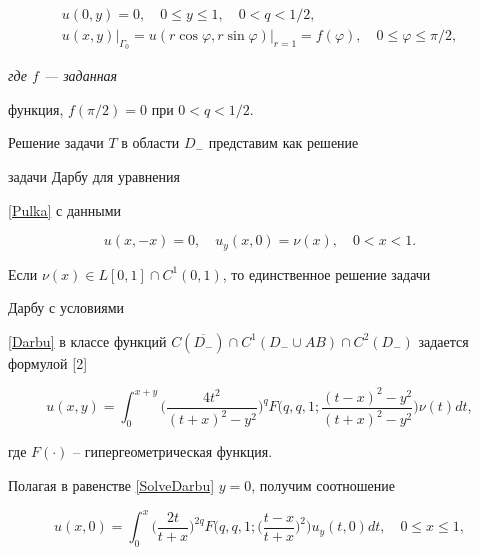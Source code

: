\begin{gather}\label{OnAKE}


u(0,y) = 0, \quad 0\leq y\leq 1, \quad 0<q<1/2,\\


%


\label{OnGammaE}


u(x,y)\big|_{\Gamma_{0}}=u(r\cos\varphi,r\sin\varphi)\big|_{r=1}


 = f(\varphi), \quad 0\leq \varphi\leq \pi/2,


\end{gather} 


{\it где $f$ --- заданная


функция, $f(\pi/2)=0$ при $0<q<1/2$.}


\medskip





Решение задачи $T$ в области $D_-$ представим как решение


задачи Дарбу для уравнения


\eqref{Pulka} с данными


\begin{equation}\label{Darbu}


u(x,-x)=0,\quad u_y(x,0)=\nu(x),\quad 0< x< 1.


\end{equation}


Если $\nu(x) \in L[0,1]\cap C^1(0,1)$, то единственное решение задачи 


Дарбу с условиями


\eqref{Darbu} в классе функций $C(\overline{D_-})\cap C^1(D_-\cup AB)


\cap C^2(D_-)$ задается формулой [2]


\begin{equation}\label{SolveDarbu}


u(x,y)= \int_0^{x+y}\bigg(\frac{4t^2}{(t+x)^2-y^2}\bigg)^{q}


F\bigg(q,q,1;\frac{(t-x)^2-y^2 }{(t+x)^2-y^2}\bigg)\nu(t)dt,


\end{equation}


где $F(\cdot)$ -- гипергеометрическая функция.





Полагая в равенстве \eqref{SolveDarbu} $y=0$, получим соотношение


\begin{equation}\label{Link}


u(x,0) = \int_0^x \bigg(\frac{2t}{t+x}\bigg)^{2q}


F\bigg(q,q,1;\bigg(\frac{t-x}{t+x}\bigg)^2\bigg)u_y(t,0)dt,\quad 0\leq


x\leq1,


\end{equation}


